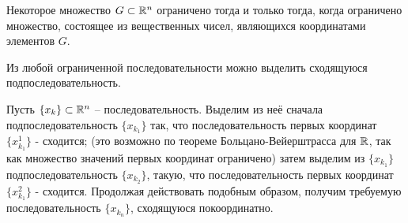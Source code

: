 \begin{sledstvie}
Некоторое множество $G\subset\mathbb{R}^n$ ограничено тогда и только тогда, когда ограничено множество, состоящее из вещественных чисел, являющихся координатами элементов $G$.
\end{sledstvie}

\begin{teorema}
Из любой ограниченной последовательности можно выделить сходящуюся подпоследовательность.
\end{teorema}
\dokvo
Пусть $\{x_k\}\subset\mathbb{R}^n$ -- последовательность.
Выделим из неё сначала подпоследовательность $\{x_{k_1}\}$ так, что последовательность первых координат $\{x_{k_1}^1\}$ - сходится;
(это возможно по теореме Больцано-Вейерштрасса для $\mathbb{R}$, так как множество значений первых координат ограничено)
затем выделим из $\{x_{k_1}\}$ подпоследовательность $\{x_{k_2}\}$, такую, что последовательность первых координат $\{x_{k_1}^2\}$ - сходится.
Продолжая действовать подобным образом, получим требуемую последовательность $\{x_{k_n}\}$, сходящуюся покоординатно.
\dokno
